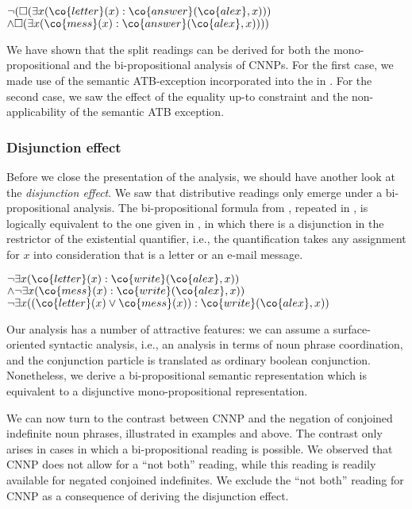 \documentclass[output=paper]{langsci/langscibook}
\begin{document}
\ea \label{ATB-brauch-bi}
$\lnot (\Box(\exists x (\co{letter}(x) : \co{answer}(\co{alex},x)))$\\
\hspace*{\fill} $\land 
\Box(\exists x (\co{mess}(x) : \co{answer}(\co{alex},x))))$
\z 


We have shown that the split readings can be derived for both the mono-propositional and the bi-propositional analysis of CNNPs. For the first case, we made use of the semantic ATB-exception incorporated into the \CCB{} in . For the second case, we saw the effect of the equality up-to constraint and the non-applicability of the semantic ATB exception.


\subsubsection{Disjunction effect}
\label{Sec-AnalysisDisjunctionEffect}

Before we close the presentation of the analysis, we should have another look at the \emph{disjunction effect}.
We saw that distributive readings only emerge under a bi-propositional analysis. 
 The bi-propositional formula from , repeated in , is logically equivalent to the one given in , in which there is a disjunction in the restrictor of the existential quantifier, i.e., the quantification takes any assignment for $x$ into consideration that is a letter or an e-mail message.

\ea 
\begin{xlist}
\ex \label{alex-cnnp-lf3bi}
$\lnot \exists x (\co{letter}(x) : \co{write}(\co{alex},x))$%
$\land \lnot \exists x (\co{mess}(x) : \co{write}(\co{alex},x))$
\ex \label{alex-cnnp-lf3}
$\lnot \exists x ((\co{letter}(x) \lor \co{mess}(x)) : \co{write}(\co{alex},x))$
\end{xlist}
\z 

Our analysis has a number of attractive features: 
we can assume a surface-oriented syntactic analysis, i.e., an analysis in terms of noun phrase coordination, and the conjunction particle  is translated as ordinary boolean conjunction. 
Nonetheless, we derive a bi-propositional semantic representation which is equivalent to a disjunctive mono-propositional representation.


We can now turn to the contrast between CNNP and the negation of conjoined indefinite noun phrases, illustrated in examples  and  above. 
The contrast only arises in cases in which a bi-propositional reading is possible. 
We observed that CNNP does not allow for a ``not both'' reading, while this reading is readily available for negated conjoined indefinites. 
We exclude the ``not both'' reading for CNNP as a consequence of deriving the disjunction effect. 
\end{document}
